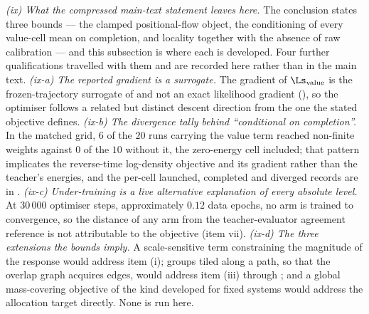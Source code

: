 \emph{(ix) What the compressed main-text statement leaves here.} The conclusion states
three bounds --- the clamped positional-flow object, the conditioning
of every value-cell mean on completion, and locality together with the absence of raw
calibration --- and this
subsection is where each is developed. Four further qualifications travelled with them
and are recorded here rather than in the main text. \emph{(ix-a) The reported gradient
is a surrogate.} The gradient of $\Ls_{\mathrm{value}}$ is the frozen-trajectory
surrogate of  and not an exact likelihood gradient
(), so the optimiser follows a related but distinct descent
direction from the one the stated objective defines. \emph{(ix-b) The divergence tally
behind ``conditional on completion''.} In the matched grid, $6$ of the $20$ runs
carrying the value term reached non-finite weights against $0$ of the $10$ without it,
the zero-energy cell included; that pattern implicates the reverse-time log-density
objective and its gradient rather than the teacher's energies, and the per-cell
launched, completed and diverged records are in
. \emph{(ix-c) Under-training is a live alternative
explanation of every absolute level.} At $30\,000$ optimiser steps, approximately
$0.12$ data epochs, no arm is trained to convergence, so the distance of any arm from
the teacher-evaluator agreement reference is not attributable to the objective (item
vii). \emph{(ix-d) The three extensions the bounds imply.} A scale-sensitive term
constraining the magnitude of the response would address item (i); groups tiled along a
path, so that the overlap graph acquires edges, would address item (iii) through
; and a global mass-covering objective of the kind developed for fixed
systems \citep{fab} would address the allocation target directly. None is run here.


